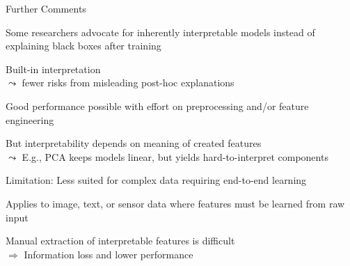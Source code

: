\documentclass[10pt,compress,t,notes=noshow,xcolor=table]{beamer}
\begin{document}
\begin{framev}[align=top]{Further Comments}
\begin{itemizeM}
\item<1-> Some researchers advocate for inherently interpretable models instead of explaining black boxes after training 
\begin{itemizeS}
\item Built-in interpretation\\
$\leadsto$ fewer risks from misleading post-hoc explanations
\item Good performance possible with effort on preprocessing and/or feature engineering
\item But interpretability depends on meaning of created features\\
$\leadsto$ E.g., PCA keeps models linear, but yields hard-to-interpret components
\end{itemizeS}
\item<2-> Limitation: Less suited for complex data requiring end-to-end learning
\begin{itemizeS}
\item Applies to image, text, or sensor data where features must be learned from raw input
\item Manual extraction of interpretable features is difficult\\
$\Rightarrow$ Information loss and lower performance
\end{itemizeS}
\end{itemizeM}
\end{framev}
\end{document}
